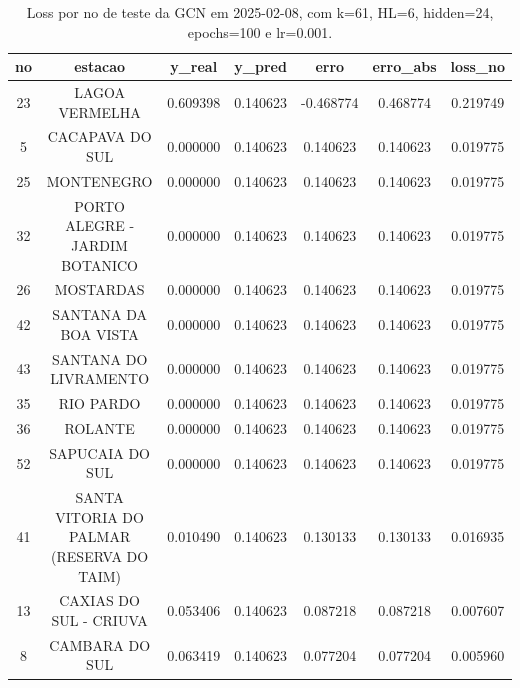 \begin{table}[h]
\centering
\caption{Loss por no de teste da GCN em 2025-02-08, com k=61, HL=6, hidden=24, epochs=100 e lr=0.001.}
\label{tab:gcn_loss_k61_hl6_h24_e100_d20250208}
\begin{tabular}{ccccccc}
\toprule
no & estacao & y\_real & y\_pred & erro & erro\_abs & loss\_no \\
\midrule
23 & LAGOA VERMELHA & 0.609398 & 0.140623 & -0.468774 & 0.468774 & 0.219749 \\
5 & CACAPAVA DO SUL & 0.000000 & 0.140623 & 0.140623 & 0.140623 & 0.019775 \\
25 & MONTENEGRO & 0.000000 & 0.140623 & 0.140623 & 0.140623 & 0.019775 \\
32 & PORTO ALEGRE - JARDIM BOTANICO & 0.000000 & 0.140623 & 0.140623 & 0.140623 & 0.019775 \\
26 & MOSTARDAS & 0.000000 & 0.140623 & 0.140623 & 0.140623 & 0.019775 \\
42 & SANTANA DA BOA VISTA & 0.000000 & 0.140623 & 0.140623 & 0.140623 & 0.019775 \\
43 & SANTANA DO LIVRAMENTO & 0.000000 & 0.140623 & 0.140623 & 0.140623 & 0.019775 \\
35 & RIO PARDO & 0.000000 & 0.140623 & 0.140623 & 0.140623 & 0.019775 \\
36 & ROLANTE & 0.000000 & 0.140623 & 0.140623 & 0.140623 & 0.019775 \\
52 & SAPUCAIA DO SUL & 0.000000 & 0.140623 & 0.140623 & 0.140623 & 0.019775 \\
41 & SANTA VITORIA DO PALMAR (RESERVA DO TAIM) & 0.010490 & 0.140623 & 0.130133 & 0.130133 & 0.016935 \\
13 & CAXIAS DO SUL - CRIUVA & 0.053406 & 0.140623 & 0.087218 & 0.087218 & 0.007607 \\
8 & CAMBARA DO SUL & 0.063419 & 0.140623 & 0.077204 & 0.077204 & 0.005960 \\
\bottomrule
\end{tabular}
\end{table}
